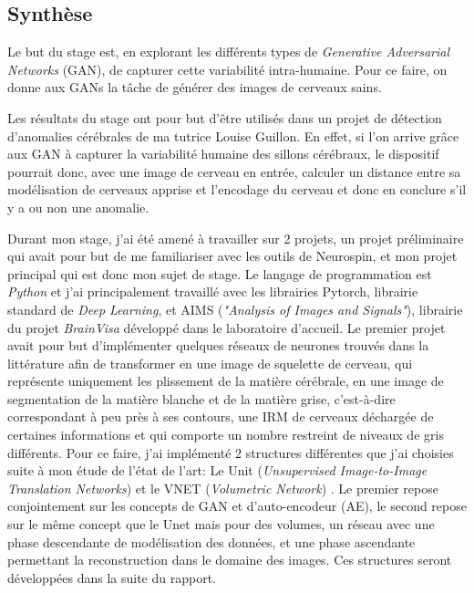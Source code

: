 \documentclass[12pt, oneside, a4paper, titlepage]{article}
\begin{document}
\subsection{Synthèse}

\vspace{5mm} 

Le but du stage est, en explorant les différents types de \textit{Generative Adversarial Networks} (GAN), de capturer cette variabilité intra-humaine. Pour ce faire, on donne aux GANs la tâche de générer des images de cerveaux sains.

\vspace{5mm} 

Les résultats du stage ont pour but d’être utilisés dans un projet de détection d’anomalies cérébrales de ma tutrice Louise Guillon. En effet, si l’on arrive grâce aux GAN à capturer la variabilité humaine des sillons cérébraux, le dispositif pourrait donc, avec une image de cerveau en entrée, calculer un distance entre sa modélisation de cerveaux apprise et l’encodage du cerveau et donc en conclure s'il y a ou non une anomalie. 

\vspace{5mm} 

Durant mon stage, j’ai été amené à travailler sur 2 projets, un projet préliminaire qui avait pour but de me familiariser avec les outils de Neurospin, et mon projet principal qui est donc mon sujet de stage. Le langage de programmation est \textit{Python} et j'ai principalement travaillé avec les librairies Pytorch, librairie standard de \textit{Deep Learning}, et AIMS (\textit{"Analysis of Images and Signals"}), librairie du projet \textit{BrainVisa} développé dans le laboratoire d'accueil.
Le premier projet avait pour but d’implémenter quelques réseaux de neurones trouvés dans la littérature afin de transformer en une image de squelette de cerveau, qui représente uniquement les plissement de la matière cérébrale, en une image de segmentation de la matière blanche et de la matière grise, c'est-à-dire correspondant à peu près à ses contours, une IRM de cerveaux déchargée de certaines informations et qui comporte un nombre restreint de niveaux de gris différents.
Pour ce faire, j’ai implémenté 2 structures différentes que j’ai choisies suite à mon étude de l’état de l’art: Le Unit (\textit{Unsupervised Image-to-Image Translation Networks}) \cite{liu_unsupervised_2018} et le VNET (\textit{Volumetric Network}) \cite{milletari_v-net_2016}. Le premier repose conjointement sur les concepts de GAN et d’auto-encodeur (AE), le second repose sur le même concept que le Unet \cite{ronneberger_u-net_2015} mais pour des volumes, un réseau avec une phase descendante de modélisation des données, et une phase ascendante permettant la reconstruction dans le domaine des images. Ces structures seront développées dans la suite du rapport.
\end{document}
